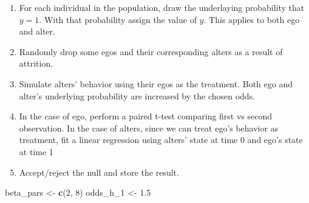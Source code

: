 \documentclass[]{book}
\newenvironment{Shaded}{\begin{snugshade}}{\end{snugshade}}
\newcommand{\DecValTok}[1]{\textcolor[rgb]{0.00,0.00,0.81}{#1}}
\newcommand{\FloatTok}[1]{\textcolor[rgb]{0.00,0.00,0.81}{#1}}
\newcommand{\KeywordTok}[1]{\textcolor[rgb]{0.13,0.29,0.53}{\textbf{#1}}}
\newcommand{\NormalTok}[1]{#1}
\newcommand{\StringTok}[1]{\textcolor[rgb]{0.31,0.60,0.02}{#1}}
\begin{document}
\begin{enumerate}
\def\labelenumi{\arabic{enumi}.}
\item
  For each individual in the population, draw the underlaying probability that \(y = 1\). With that probability assign the value of \(y\). This applies to both ego and alter.
\item
  Randomly drop some egos and their corresponding alters as a result of attrition.
\item
  Simulate alters' behavior using their egos as the treatment. Both ego and alter's underlying probability are increased by the chosen odds.
\item
  In the case of ego, perform a paired t-test comparing first vs second observation. In the case of alters, since we can treat ego's behavior as treatment, fit a linear regression using alters' state at time 0 and ego's state at time 1
\item
  Accept/reject the null and store the result.
\end{enumerate}

\begin{Shaded}
\begin{Highlighting}[]
\NormalTok{beta_pars <-}\StringTok{ }\KeywordTok{c}\NormalTok{(}\DecValTok{2}\NormalTok{, }\DecValTok{8}\NormalTok{)}
\NormalTok{odds_h_}\DecValTok{1}\NormalTok{  <-}\StringTok{ }\FloatTok{1.5}
\end{Highlighting}
\end{Shaded}
\end{document}
